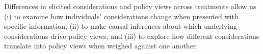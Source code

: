 \documentclass[12pt]{article}
\begin{document}
Differences in elicited considerations and policy views across treatments allow us (i) to examine how individuals’ considerations change when presented with specific information, (ii) to make causal inferences about which underlying considerations drive policy views, and (iii) to explore how different considerations translate into policy views when weighed against one another. 



\end{document}
